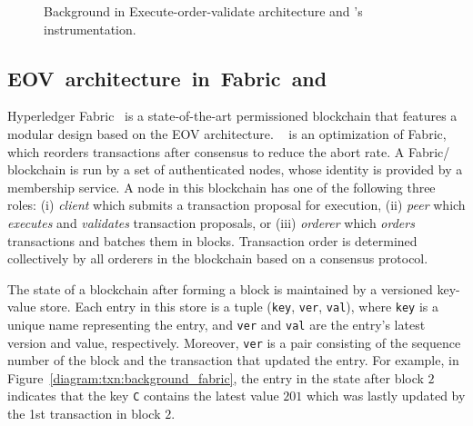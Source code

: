 \begin{figure}[h!]
\begin{subfigure}{0.28\textwidth}
      \caption{}
      \label{diagram:txn:background_orderer}
    \end{subfigure}
    \caption{Background in Execute-order-validate architecture and {\fabricPlusplus}'s instrumentation.}
    \label{diagram:txn:background}
\end{figure}

\subsection{EOV~architecture~in~Fabric~and~{\fabricPlusplus}}
\label{sec:txn:background_fabric}

Hyperledger Fabric~\cite{androulaki2018hyperledger} is a state-of-the-art
permissioned blockchain that features a modular design based on the EOV architecture.
%
{\fabricPlusplus}~\cite{sharma2019blurring} is an optimization of Fabric, which reorders transactions after consensus to reduce the abort rate.
%
A Fabric/{\fabricPlusplus} blockchain is run by a set of authenticated nodes, whose identity is
provided by a membership service.
%
A node in this blockchain has one of the following three roles:
%
(i) \textit{client} which submits a transaction proposal for execution,
%
(ii) \textit{peer} which \textit{executes} and \textit{validates}
transaction proposals,
%
or (iii) \textit{orderer} which \textit{orders} transactions and batches
them in blocks.
%
Transaction order is determined collectively by all orderers in
the blockchain based on a consensus protocol.
%

The state of a blockchain after forming a block is maintained by a
versioned key-value store.
% 
Each entry in this store is a tuple (\texttt{key}, \texttt{ver},
\texttt{val}), where \texttt{key} is a unique name representing the entry, and
\texttt{ver} and \texttt{val} are the entry's latest version and value, respectively.
% 
Moreover, \texttt{ver} is a pair consisting of the sequence number of the block
and the transaction that updated the entry.
%
For example, in Figure~\ref{diagram:txn:background_fabric}, the entry  in
the state after block $2$ indicates that the key \texttt{C} contains the latest
value $201$ which was lastly updated by the 1st transaction in block $2$.

